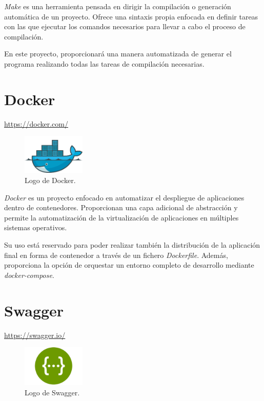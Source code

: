 \textit{Make} es una herramienta pensada en dirigir la compilación o generación automática de un proyecto. Ofrece una sintaxis propia enfocada en definir tareas con las que ejecutar los comandos necesarios para llevar a cabo el proceso de compilación.\sn

En este proyecto, proporcionará una manera automatizada de generar el programa realizando todas las tareas de compilación necesarias.\sn


\section{Docker} \label{sec:docker}

\footnotesize\color{gray}
\url{https://docker.com/}
\normalsize\color{black}\sn

\begin{figure}
\includegraphics[width=3cm]{img/tables/15_Docker.png}
\caption{Logo de Docker.}
\label{fig:docker}
\end{figure}

\textit{Docker} es un proyecto enfocado en automatizar el despliegue de aplicaciones dentro de contenedores. Proporcionan una capa adicional de abstracción y permite la automatización de la virtualización de aplicaciones en múltiples sistemas operativos.\sn

Su uso está reservado para poder realizar también la distribución de la aplicación final en forma de contenedor a través de un fichero \textit{Dockerfile}. Además, proporciona la opción de orquestar un entorno completo de desarrollo mediante \textit{docker-compose}.\sn


\section{Swagger} \label{sec:swagger}

\footnotesize\color{gray}
\url{https://swagger.io/}
\normalsize\color{black}\sn

\begin{figure}
\includegraphics[width=3cm]{img/tables/16_Swagger.png}
\caption{Logo de Swagger.}
\label{fig:swagger}
\end{figure}

